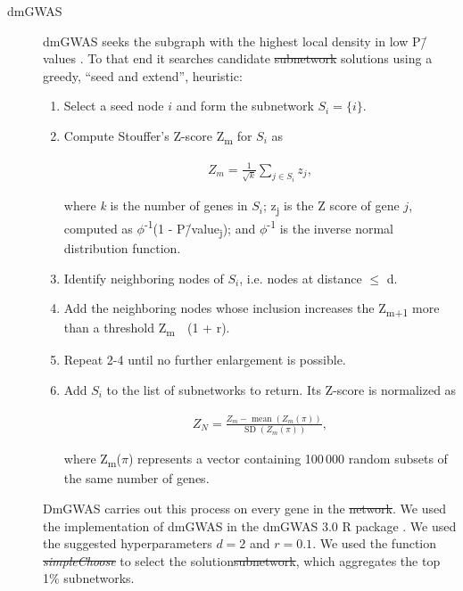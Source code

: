 \documentclass[10pt,letterpaper]{article}
\providecommand{\DIFaddtex}[1]{{\protect\color{blue}\uwave{#1}}} %
\providecommand{\DIFdeltex}[1]{{\protect\color{red}\sout{#1}}}                      %
\providecommand{\DIFaddbegin}{} %
\providecommand{\DIFaddend}{} %
\providecommand{\DIFdelbegin}{} %
\providecommand{\DIFdelend}{} %
\providecommand{\DIFadd}[1]{\texorpdfstring{\DIFaddtex{#1}}{#1}} %
\providecommand{\DIFdel}[1]{\texorpdfstring{\DIFdeltex{#1}}{}} %
\newcommand{\DIFscaledelfig}{0.5}
\newlength{\DIFdelgraphicswidth} %
\newlength{\DIFdelgraphicsheight} %
\newcommand{\DIFaddincludegraphics}[2][]{{\color{blue}\fbox{\DIFOincludegraphics[#1]{#2}}}} %
\newcommand{\DIFdelincludegraphics}[2][]{%
\sbox{\DIFdelgraphicsbox}{\DIFOincludegraphics[#1]{#2}}%
\settoboxwidth{\DIFdelgraphicswidth}{\DIFdelgraphicsbox} %
\settoboxtotalheight{\DIFdelgraphicsheight}{\DIFdelgraphicsbox} %
\scalebox{\DIFscaledelfig}{%
\parbox[b]{\DIFdelgraphicswidth}{\usebox{\DIFdelgraphicsbox}\\[-\baselineskip] \rule{\DIFdelgraphicswidth}{0em}}\llap{\resizebox{\DIFdelgraphicswidth}{\DIFdelgraphicsheight}{%
\setlength{\unitlength}{\DIFdelgraphicswidth}%
\begin{picture}(1,1)%
\thicklines\linethickness{2pt} %
{\color[rgb]{1,0,0}\put(0,0){\framebox(1,1){}}}%
{\color[rgb]{1,0,0}\put(0,0){\line( 1,1){1}}}%
{\color[rgb]{1,0,0}\put(0,1){\line(1,-1){1}}}%
\end{picture}%
}\hspace*{3pt}}} %
} %
\DeclareRobustCommand{\DIFaddbegin}{\DIFOaddbegin \let\includegraphics\DIFaddincludegraphics} %
\DeclareRobustCommand{\DIFaddend}{\DIFOaddend \let\includegraphics\DIFOincludegraphics} %
\DeclareRobustCommand{\DIFdelbegin}{\DIFOdelbegin \let\includegraphics\DIFdelincludegraphics} %
\DeclareRobustCommand{\DIFdelend}{\DIFOaddend \let\includegraphics\DIFOincludegraphics} %
\begin{document}
\begin{description}
\item[{dmGWAS}] dmGWAS seeks the subgraph with the highest local density in low P\=/values \cite{jia_dmgwas:_2011}. To that end it searches candidate \DIFdelbegin \DIFdel{subnetwork }\DIFdelend solutions using a greedy, ``seed and extend'', heuristic:

\begin{enumerate}
\item Select a seed node $i$ and form the subnetwork $S_i=\{i\}$.
\item Compute Stouffer's Z-score Z\textsubscript{m} for $S_i$ as

\begin{eqnarray} 
Z_m = \frac{1}{\sqrt{k}} \sum_{j \in S_i} z_j,
\end{eqnarray}

where \emph{k} is the number of genes in $S_i$; z\textsubscript{j} is the Z score of gene $j$, computed as \(\phi\)\textsuperscript{-1}(1 - P\=/value\textsubscript{j}); and \(\phi\)\textsuperscript{-1} is the inverse normal distribution function.
\item Identify neighboring nodes of $S_i$,  i.e. nodes at distance \(\le\) d.
\item Add the neighboring nodes whose inclusion increases the Z\textsubscript{m+1} more than a threshold Z\textsubscript{m}~\texttimes{}~(1 + r).
\item Repeat 2-4 until no further enlargement is possible.
\item Add $S_i$ to the list of subnetworks to return. Its Z-score is normalized as

\begin{eqnarray}
Z_{N}=\frac{Z_{m}-\operatorname{mean}\left(Z_{m}(\pi)\right)}{\operatorname{SD}\left(Z_{m}(\pi)\right)},
\end{eqnarray} 

where Z\textsubscript{m}(\(\pi\)) represents a vector containing 100\,000 random subsets of the same number of genes.
\end{enumerate}

DmGWAS carries out this process on every gene in the \DIFdelbegin \DIFdel{network}\DIFdelend \DIFaddbegin \DIFadd{PPIN}\DIFaddend . We used the implementation of dmGWAS in the dmGWAS 3.0 R package \cite{dmgwas}. We used the suggested hyperparameters $d = 2$ and $r = 0.1$. We used the function \DIFdelbegin \emph{\DIFdel{simpleChoose}} %
\DIFdelend \DIFaddbegin \texttt{\DIFadd{simpleChoose}} \DIFaddend to select the solution\DIFdelbegin \DIFdel{subnetwork}\DIFdelend , which aggregates the top 1\% subnetworks.


\end{description}
\end{document}
